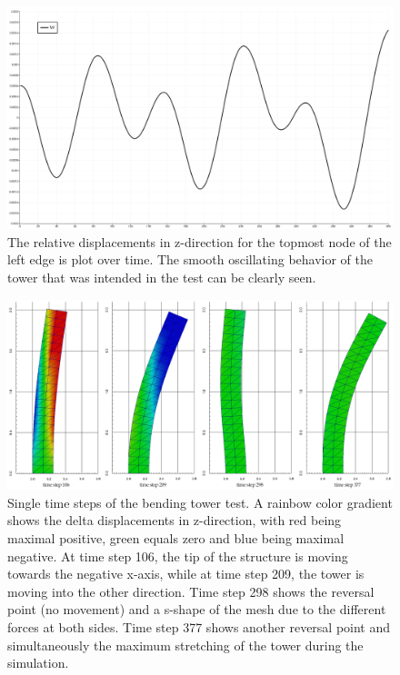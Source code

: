 	\begin{figure}[htbp]
	 \centering
	 \includegraphics[width=1.0\linewidth]{figures/i-beam_w}
     \caption{The relative displacements in z-direction for the topmost node of the left edge is plot over time. The smooth oscillating behavior of the tower that was intended in the test can be clearly seen.}
	 \label{fig:testHa1}
	\end{figure}    

    \begin{landscape}
     \begin{figure}[htbp]
      \centering
      \includegraphics[width=1.0\linewidth]{figures/frames}
      \caption{Single time steps of the bending tower test. A rainbow color gradient shows the delta displacements in z-direction, with red being maximal positive, green equals zero and blue being maximal negative. At time step 106, the tip of the structure is moving towards the negative x-axis, while at time step 209, the tower is moving into the other direction. Time step 298 shows the reversal point (no movement) and a s-shape of the mesh due to the different forces at both sides. Time step 377 shows another reversal point and simultaneously the maximum stretching of the tower during the simulation.}
      \label{fig:testHa2}
     \end{figure}
    \end{landscape}
  
